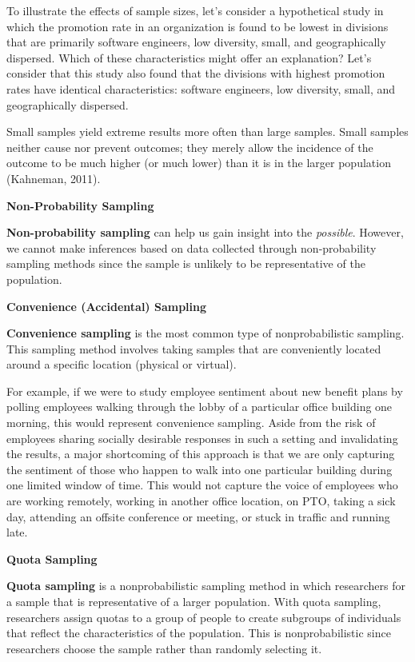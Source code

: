 \documentclass[
]{book}
\begin{document}
To illustrate the effects of sample sizes, let's consider a hypothetical study in which the promotion rate in an organization is found to be lowest in divisions that are primarily software engineers, low diversity, small, and geographically dispersed. Which of these characteristics might offer an explanation? Let's consider that this study also found that the divisions with highest promotion rates have identical characteristics: software engineers, low diversity, small, and geographically dispersed.

Small samples yield extreme results more often than large samples. Small samples neither cause nor prevent outcomes; they merely allow the incidence of the outcome to be much higher (or much lower) than it is in the larger population (Kahneman, 2011).

\textbf{Non-Probability Sampling}

\textbf{Non-probability sampling} can help us gain insight into the \emph{possible}. However, we cannot make inferences based on data collected through non-probability sampling methods since the sample is unlikely to be representative of the population.

\textbf{Convenience (Accidental) Sampling}

\textbf{Convenience sampling} is the most common type of nonprobabilistic sampling. This sampling method involves taking samples that are conveniently located around a specific location (physical or virtual).

For example, if we were to study employee sentiment about new benefit plans by polling employees walking through the lobby of a particular office building one morning, this would represent convenience sampling. Aside from the risk of employees sharing socially desirable responses in such a setting and invalidating the results, a major shortcoming of this approach is that we are only capturing the sentiment of those who happen to walk into one particular building during one limited window of time. This would not capture the voice of employees who are working remotely, working in another office location, on PTO, taking a sick day, attending an offsite conference or meeting, or stuck in traffic and running late.

\textbf{Quota Sampling}

\textbf{Quota sampling} is a nonprobabilistic sampling method in which researchers for a sample that is representative of a larger population. With quota sampling, researchers assign quotas to a group of people to create subgroups of individuals that reflect the characteristics of the population. This is nonprobabilistic since researchers choose the sample rather than randomly selecting it.
\end{document}
